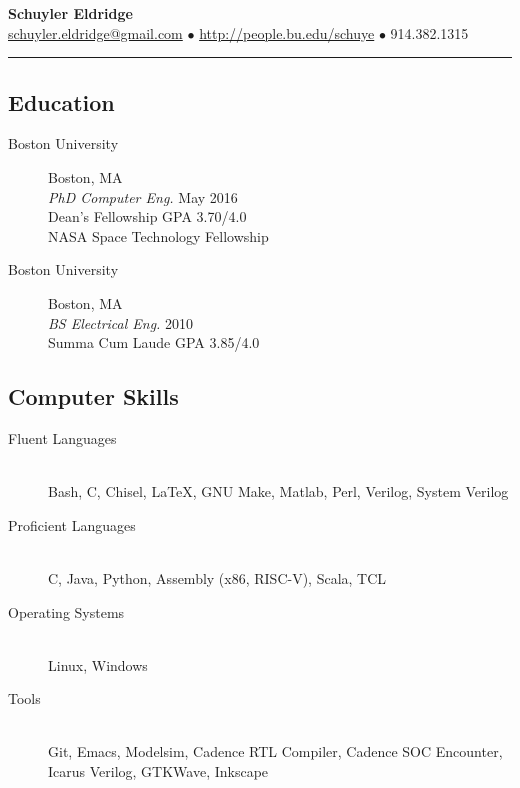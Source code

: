 \documentclass[letterpage]{article}
\newcommand{\CPP}
{C\nolinebreak[4]\hspace{-.05em}\raisebox{.22ex}{\footnotesize\bf ++}}
\begin{document}
\begin{center}

{\huge \textbf{Schuyler Eldridge}}\\
\href{mailto:schuyler.eldridge@gmail.com}{schuyler.eldridge@gmail.com}
$\bullet$ \url{http://people.bu.edu/schuye} $\bullet$ 914.382.1315
\end{center}
\hrule
\vspace{5pt}

\noindent
\begin{minipage}[t]{0.36\textwidth}
  \subsection*{Education}
  \vspace{-5pt}
  \begin{description}
  \item[Boston University] \hfill Boston, MA\\ \emph{PhD Computer
    Eng.} \hfill May 2016\\ Dean's Fellowship \hfill GPA 3.70/4.0
    \\NASA Space Technology Fellowship
  \item[Boston University] \hfill Boston, MA\\ \emph{BS Electrical
    Eng.} \hfill 2010\\ Summa Cum Laude \hfill GPA 3.85/4.0
  \end{description}

  \subsection*{Computer Skills}
  \vspace{-5pt}
  \begin{description}
  \item[Fluent Languages] \hfill\\ Bash, C, Chisel, \LaTeX, GNU Make, Matlab, Perl, Verilog, System Verilog
    \vspace{-5pt}
  \item[Proficient Languages] \hfill\\ \CPP, Java, Python, Assembly (x86, RISC-V), Scala, TCL
    \vspace{-5pt}
  \item[Operating Systems] \hfill\\ Linux, Windows
    \vspace{-5pt}
  \item[Tools] \hfill\\ Git, Emacs, Modelsim, Cadence RTL Compiler, Cadence SOC Encounter, Icarus Verilog, GTKWave, Inkscape
  \end{description}


\end{minipage}
\end{document}
